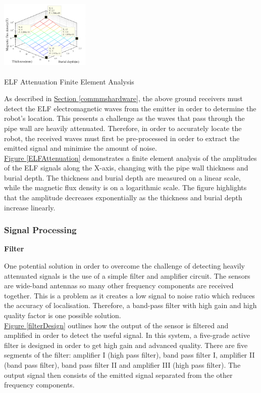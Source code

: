 \documentclass[11pt]{article}		%
\newcommand{\supercite}[1]{\textsuperscript{\cite{#1}}}		%
\newcommand{\figref}[1]{\hyperref[#1]{Figure \ref*{#1}}}    %
\newcommand{\sectref}[1]{\hyperref[#1]{Section \ref*{#1}}}     %
\begin{document}
		    \begin{floatingfigure}[r]{0.35\textwidth}
				\centering
				\includegraphics[width = 0.32\textwidth]{Attenuation}
				\caption{ELF Attenuation Finite Element Analysis\supercite{FDT}}
				\label{ELFAttenuation}
			\end{floatingfigure}
            \hspace*{2ex}As described in \sectref{commmshardware}, the above ground receivers must detect the ELF electromagnetic waves from the emitter in order to determine the robot's location.
			This presents a challenge as the waves that pass through the pipe wall are heavily attenuated. 
			Therefore, in order to accurately locate the robot, the received waves must first be pre-processed in order to extract the emitted signal and minimise the amount of noise.
			\\	    
		    \hspace*{2ex}\figref{ELFAttenuation} demonstrates a finite element analysis of the amplitudes of the ELF signals along the X-axis, changing with the pipe wall thickness and burial depth.
		    The thickness and burial depth are measured on a linear scale, while the magnetic flux density is on a logarithmic scale.
		    The figure highlights that the amplitude decreases exponentially as the thickness and burial depth increase linearly.

			\subsubsection{Signal Processing}

			\textbf{Filter}
		    \begin{floatingfigure}[r]{0pt} \end{floatingfigure}
	        One potential solution in order to overcome the challenge of detecting heavily attenuated signals is the use of a simple filter and amplifier circuit.
	        The sensors are wide-band antennas so many other frequency components are received together. This is a problem as it creates a low signal to noise ratio which reduces the accuracy of localisation.
	        Therefore, a band-pass filter with high gain and high quality factor is one possible solution.
	        \\
	        \hspace*{2ex}\figref{filterDesign} outlines how the output of the sensor is filtered and amplified in order to detect the useful signal. 
	        In this system, a five-grade active filter is designed in order to get high gain and advanced quality. There are five segments of the filter: amplifier I (high pass filter), band pass filter I, amplifier II (band pass filter), band pass filter II and amplifier III (high pass filter).
	        The output signal then consists of the emitted signal separated from the other frequency components. 
	        
\end{document}
